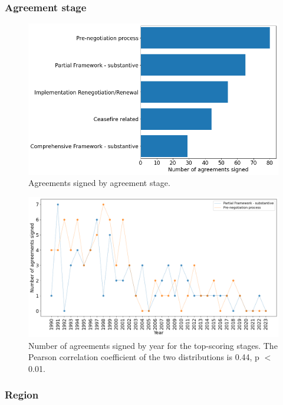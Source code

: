 \documentclass{article}
\begin{document}
\subsubsection{Agreement stage}

\begin{figure}[H]
\begin{center}
\includegraphics[scale=0.40]{./assets/figure_8.png}
\caption{Agreements signed by agreement stage.}
\end{center}
\end{figure}

\begin{figure}[H]
\begin{center}
\includegraphics[scale=0.36]{./assets/figure_11.png}
\caption{Number of agreements signed by year for the top-scoring stages. The Pearson correlation coefficient of the two distributions is 0.44, p $<$ 0.01.}
\end{center}
\end{figure}

\subsubsection{Region}
\end{document}
